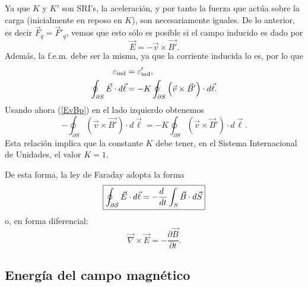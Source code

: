  Ya que $K$ y $K'$ son SRI's, la aceleración, y por tanto la fuerza que actúa sobre la carga (inicialmente en reposo en $K$), son necesariamente iguales. De lo anterior, es decir $\vec{F}_q=\vec{F}'_q$, vemos que esto sólo es posible si el campo inducido es dado por
 \begin{equation}\label{EvBp}
\vec{E}=-\vec{v}\times\vec{B'}.
\end{equation}
Además, la f.e.m. debe ser la misma, ya que la corriente inducida lo es, por lo que
\begin{align}
\varepsilon_{\rm ind} &= \varepsilon'_{\rm ind}, \\
\oint_{\partial S}\vec{E}\cdot d\vec{\ell} &=-K\oint_{\partial S}\left(\vec{v}\times\vec{B}'\right)\cdot d\vec{\ell}.
\end{align}
Usando ahora (\ref{EvBp}) en el lado izquierdo obtenemos
\begin{equation}
-\oint_{\partial S}\left(\vec{v}\times\vec{B'}\right)\cdot d\vec{\ell} =-K\oint_{\partial S}\left(\vec{v}\times\vec{B}'\right)\cdot d\vec{\ell}.
\end{equation}
Esta relación implica que la constante $K$ debe tener, en el Sistema Internacional de Unidades, el valor $K=1$. 

De esta forma, la ley de Faraday adopta la forma
\begin{equation}
\boxed{\oint_{\cal\partial S}\vec{E}\cdot d\vec{\ell}=-\frac{d\ }{dt}\int_S\vec{B}\cdot
d\vec{S}}
\end{equation}
o, en forma diferencial:
\begin{equation}
\boxed{\vec\nabla\times\vec{E}=-\frac{\partial\vec{B}}{\partial t}.}
\label{ley-faraday}
\end{equation}



\subsection{Energía del campo magnético}

